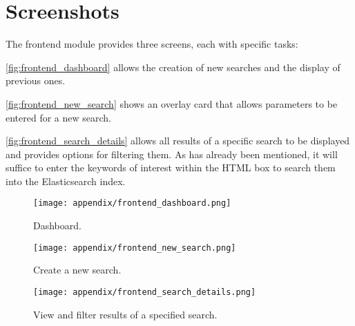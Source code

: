 \documentclass[../thesis.tex]{subfiles}
\begin{document}
\appendix
\chapter{Screenshots}\label{appendix:screenshot}
The frontend module provides three screens, each with specific tasks:

\autoref{fig:frontend_dashboard} allows the creation of new searches and the display of previous ones.

\autoref{fig:frontend_new_search} shows an overlay card that allows parameters to be entered for a new search.

\autoref{fig:frontend_search_details} allows all results of a specific search to be displayed and provides options for filtering them. As has already been mentioned, it will suffice to enter the keywords of interest within the HTML box to search them into the Elasticsearch index.

\begin{figure}[H]
    \centering
    \texttt{[image: appendix/frontend\_dashboard.png]}
    \caption[Dashboard screen]{Dashboard.}
    \label{fig:frontend_dashboard}
\end{figure}

\begin{figure}[H]
    \centering
    \texttt{[image: appendix/frontend\_new\_search.png]}
    \caption[New search creation screen]{Create a new search.}
    \label{fig:frontend_new_search}
\end{figure}

\begin{figure}[H]
    \centering
    \texttt{[image: appendix/frontend\_search\_details.png]}
    \caption[View and filter results screen]{View and filter results of a specified search.}
    \label{fig:frontend_search_details}
\end{figure}

\begin{comment}
\begin{sidewaysfigure}[ht]
    \texttt{[image: appendix/frontend\_dashboard.png]}
    \caption[Dashboard screen]{Dashboard.}
    \label{fig:frontend_dashboard}
\end{sidewaysfigure}

\begin{sidewaysfigure}[ht]
    \texttt{[image: appendix/frontend\_search\_details.png]}
    \caption[View and filter results screen]{View and filter results of a specified search.}
    \label{fig:frontend_search_details}
\end{sidewaysfigure}

\begin{sidewaysfigure}[ht]
    \texttt{[image: appendix/frontend\_search\_details.png]}
    \caption[View and filter results screen]{View and filter results of a specified search.}
    \label{fig:frontend_search_details}
\end{sidewaysfigure}
\end{comment}
\end{document}
